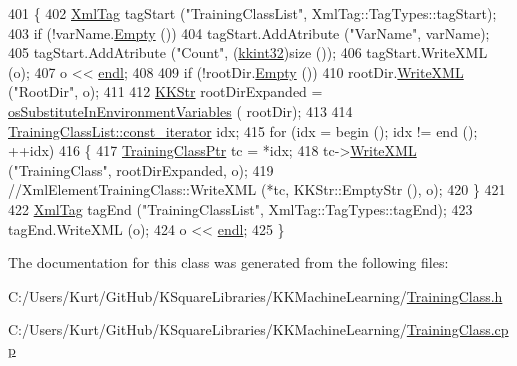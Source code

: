 \begin{DoxyCode}
401 \{
402   \hyperlink{class_k_k_b_1_1_xml_tag}{XmlTag}  tagStart (\textcolor{stringliteral}{"TrainingClassList"}, XmlTag::TagTypes::tagStart);
403   \textcolor{keywordflow}{if}  (!varName.\hyperlink{class_k_k_b_1_1_k_k_str_ac69942f73fffd672ec2a6e1c410afdb6}{Empty} ())
404     tagStart.AddAtribute (\textcolor{stringliteral}{"VarName"}, varName);
405   tagStart.AddAtribute (\textcolor{stringliteral}{"Count"}, (\hyperlink{namespace_k_k_b_a8fa4952cc84fda1de4bec1fbdd8d5b1b}{kkint32})size ());
406   tagStart.WriteXML (o);
407   o << \hyperlink{namespace_k_k_b_ad1f50f65af6adc8fa9e6f62d007818a8}{endl};
408 
409   \textcolor{keywordflow}{if}  (!rootDir.\hyperlink{class_k_k_b_1_1_k_k_str_ac69942f73fffd672ec2a6e1c410afdb6}{Empty} ())
410     rootDir.\hyperlink{class_k_k_b_1_1_k_k_str_a7de8ac49f70cdcdf2cc31786d23b8a62}{WriteXML} (\textcolor{stringliteral}{"RootDir"}, o);
411 
412   \hyperlink{class_k_k_b_1_1_k_k_str}{KKStr}  rootDirExpanded = \hyperlink{namespace_k_k_b_a8f06168f97c35a03150eec763fb2c53e}{osSubstituteInEnvironmentVariables} (
      rootDir);
413 
414   \hyperlink{class_k_k_b_1_1_k_k_queue_aeb057c9c010446f46f57c1e355f981f1}{TrainingClassList::const\_iterator}  idx;
415   \textcolor{keywordflow}{for}  (idx = begin ();  idx != end ();  ++idx)
416   \{
417     \hyperlink{class_k_k_m_l_l_1_1_training_class}{TrainingClassPtr}  tc = *idx;
418     tc->\hyperlink{class_k_k_m_l_l_1_1_training_class_a88f0762ea03cafcf0f38d8005ba4f541}{WriteXML} (\textcolor{stringliteral}{"TrainingClass"}, rootDirExpanded, o);
419     \textcolor{comment}{//XmlElementTrainingClass::WriteXML (*tc, KKStr::EmptyStr (), o);}
420   \}
421 
422   \hyperlink{class_k_k_b_1_1_xml_tag}{XmlTag}  tagEnd (\textcolor{stringliteral}{"TrainingClassList"}, XmlTag::TagTypes::tagEnd);
423   tagEnd.WriteXML (o);
424   o << \hyperlink{namespace_k_k_b_ad1f50f65af6adc8fa9e6f62d007818a8}{endl};
425 \}
\end{DoxyCode}


The documentation for this class was generated from the following files\+:\begin{DoxyCompactItemize}
\item 
C\+:/\+Users/\+Kurt/\+Git\+Hub/\+K\+Square\+Libraries/\+K\+K\+Machine\+Learning/\hyperlink{_training_class_8h}{Training\+Class.\+h}\item 
C\+:/\+Users/\+Kurt/\+Git\+Hub/\+K\+Square\+Libraries/\+K\+K\+Machine\+Learning/\hyperlink{_training_class_8cpp}{Training\+Class.\+cpp}\end{DoxyCompactItemize}
